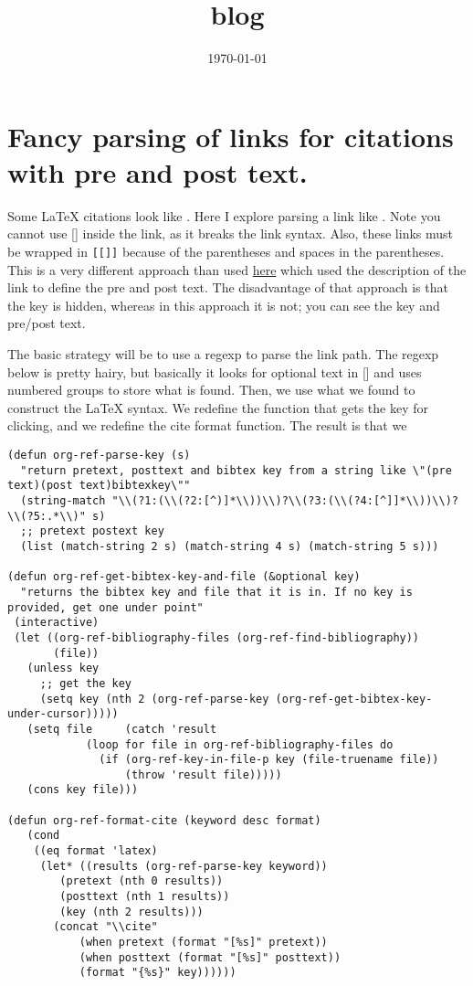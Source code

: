 \documentclass[aps,prb,citeautoscript,preprint,citeautoscript,showkeys]{revtex4-1}
\date{\today}
\title{blog}
\begin{document}
\section{Fancy parsing of links for citations with pre and post text.}
\label{sec-1}
Some \LaTeX{} citations look like \cite[pretext][post text]{key}. Here I explore parsing a link like \cite[pre text][post text]{key}. Note you cannot use [] inside the link, as it breaks the link syntax. Also, these links must be wrapped in \texttt{[[]]} because of the parentheses and spaces in the parentheses. This is a very different approach than used \href{http://kitchingroup.cheme.cmu.edu/blog/2014/05/19/Exporting-citations-with-biblatex/}{here} which used the description of the link to define the pre and post text. The disadvantage of that approach is that the key is hidden, whereas in this approach it is not; you can see the key and pre/post text.

The basic strategy will be to use a regexp to parse the link path. The regexp below is pretty hairy, but basically it looks for optional text in [] and uses numbered groups to store what is found. Then, we use what we found to construct the \LaTeX{} syntax. We redefine the function that gets the key for clicking, and we redefine the cite format function. The result is that we 

\begin{verbatim}
(defun org-ref-parse-key (s)
  "return pretext, posttext and bibtex key from a string like \"(pre text)(post text)bibtexkey\""
  (string-match "\\(?1:(\\(?2:[^)]*\\))\\)?\\(?3:(\\(?4:[^]]*\\))\\)?\\(?5:.*\\)" s)
  ;; pretext postext key
  (list (match-string 2 s) (match-string 4 s) (match-string 5 s)))

(defun org-ref-get-bibtex-key-and-file (&optional key)
  "returns the bibtex key and file that it is in. If no key is provided, get one under point"
 (interactive)
 (let ((org-ref-bibliography-files (org-ref-find-bibliography))
       (file))
   (unless key
     ;; get the key
     (setq key (nth 2 (org-ref-parse-key (org-ref-get-bibtex-key-under-cursor)))))
   (setq file     (catch 'result
		    (loop for file in org-ref-bibliography-files do
			  (if (org-ref-key-in-file-p key (file-truename file)) 
			      (throw 'result file)))))
   (cons key file)))

(defun org-ref-format-cite (keyword desc format)
   (cond
    ((eq format 'latex)
     (let* ((results (org-ref-parse-key keyword))
	    (pretext (nth 0 results))
	    (posttext (nth 1 results))
	    (key (nth 2 results)))
       (concat "\\cite" 
	       (when pretext (format "[%s]" pretext))
	       (when posttext (format "[%s]" posttext))
	       (format "{%s}" key))))))
\end{verbatim}
\end{document}
